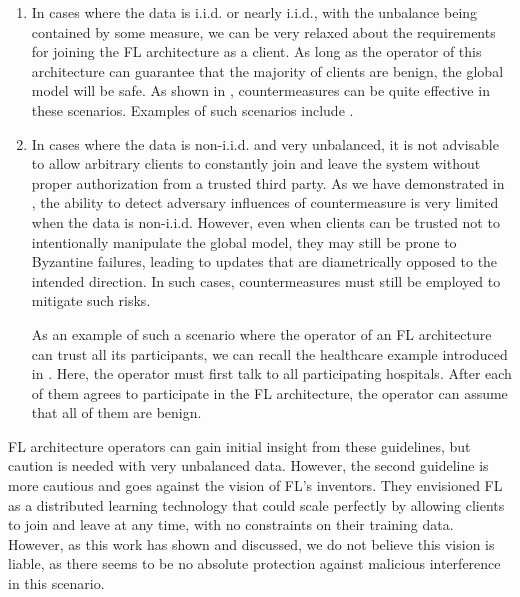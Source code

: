 \documentclass[conference]{IEEEtran}
\begin{document}
\begin{enumerate}
    \item In cases where the data is i.i.d. or nearly i.i.d., with the unbalance being contained by some measure, we can be very relaxed about the requirements for joining the FL architecture as a client. As long as the operator of this architecture can guarantee that the majority of clients are benign, the global model will be safe. As shown in , countermeasures can be quite effective in these scenarios. Examples of such scenarios include \cite{NYTimes,Konecny2017}.
    
    \item In cases where the data is non-i.i.d. and very unbalanced, it is not advisable to allow arbitrary clients to constantly join and leave the system without proper authorization from a trusted third party. As we have demonstrated in , the ability to detect adversary influences of countermeasure is very limited when the data is non-i.i.d. However, even when clients can be trusted not to intentionally manipulate the global model, they may still be prone to Byzantine failures, leading to updates that are diametrically opposed to the intended direction. In such cases, countermeasures must still be employed to mitigate such risks.
    
    As an example of such a scenario where the operator of an FL architecture can trust all its participants, we can recall the healthcare example \cite{Jochems2016,Dayan2021} introduced in . Here, the operator must first talk to all participating hospitals. After each of them agrees to participate in the FL architecture, the operator can assume that all of them are benign.  
\end{enumerate}
FL architecture operators can gain initial insight from these guidelines, but caution is needed with very unbalanced data. However, the second guideline is more cautious and goes against the vision of FL's inventors. They envisioned FL as a distributed learning technology that could scale perfectly by allowing clients to join and leave at any time, with no constraints on their training data. However, as this work has shown and discussed, we do not believe this vision is liable, as there seems to be no absolute protection against malicious interference in this scenario.




\end{document}
